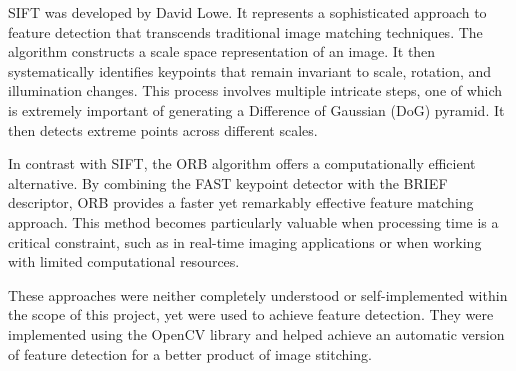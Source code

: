 \documentclass[12pt, letterpaper, ]{article}
\begin{document}
SIFT was developed by David Lowe. It represents a sophisticated approach to feature detection that transcends traditional image matching techniques. The algorithm constructs a scale space representation of an image. It then systematically identifies keypoints that remain invariant to scale, rotation, and illumination changes. This process involves multiple intricate steps, one of which is extremely important of generating a Difference of Gaussian (DoG) pyramid. It then detects extreme points across different scales. 

In contrast with SIFT, the ORB algorithm offers a computationally efficient alternative. By combining the FAST keypoint detector with the BRIEF descriptor, ORB provides a faster yet remarkably effective feature matching approach. This method becomes particularly valuable when processing time is a critical constraint, such as in real-time imaging applications or when working with limited computational resources.

These approaches were neither completely understood or self-implemented within the scope of this project, yet were used to achieve feature detection. They were implemented using the OpenCV library and helped achieve an automatic version of feature detection for a better product of image stitching.
\end{document}
